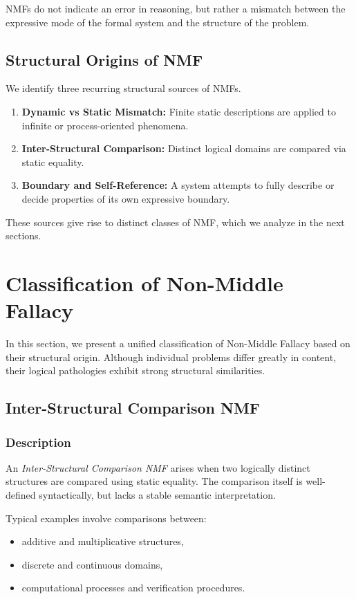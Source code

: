 \documentclass[11pt]{article}
\begin{document}
NMFs do not indicate an error in reasoning, but rather a mismatch
between the expressive mode of the formal system and the structure
of the problem.

\subsection{Structural Origins of NMF}

We identify three recurring structural sources of NMFs.

\begin{enumerate}
  \item \textbf{Dynamic vs Static Mismatch:}
        Finite static descriptions are applied to infinite or
        process-oriented phenomena.
  \item \textbf{Inter-Structural Comparison:}
        Distinct logical domains are compared via static equality.
  \item \textbf{Boundary and Self-Reference:}
        A system attempts to fully describe or decide properties of
        its own expressive boundary.
\end{enumerate}

These sources give rise to distinct classes of NMF, which we analyze
in the next sections.


\section{Classification of Non-Middle Fallacy}

In this section, we present a unified classification of Non-Middle Fallacy
based on their structural origin.
Although individual problems differ greatly in content, their logical
pathologies exhibit strong structural similarities.

\subsection{Inter-Structural Comparison NMF}

\subsubsection{Description}

An \emph{Inter-Structural Comparison NMF} arises when two logically
distinct structures are compared using static equality.
The comparison itself is well-defined syntactically, but lacks a
stable semantic interpretation.

Typical examples involve comparisons between:
\begin{itemize}
  \item additive and multiplicative structures,
  \item discrete and continuous domains,
  \item computational processes and verification procedures.
\end{itemize}
\end{document}
